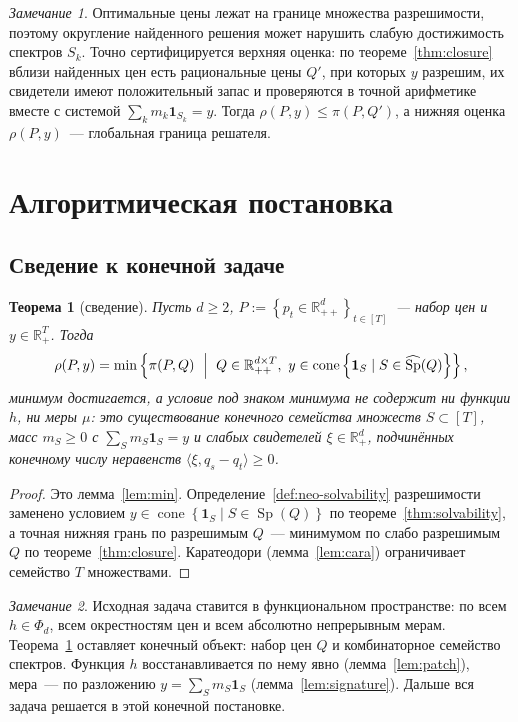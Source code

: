 \documentclass[a4paper,11pt]{article}
\theoremstyle{plain}
\newtheorem{theorem}{Теорема}[section]
\theoremstyle{definition}
\theoremstyle{remark}
\newtheorem*{remark}{Замечание}
\newcommand{\R}{\mathbb{R}}
\newcommand{\set}[1]{\left\{ #1 \right\}}
\newcommand{\ip}[2]{\langle #1, #2\rangle} %
\newcommand{\Rpp}[1][2]{\R^{#1}_{++}} %
\newcommand{\Rp}[1][2]{\R^{#1}_{+}}   %
\DeclareMathOperator{\cone}{cone}
\DeclareMathOperator{\Sp}{Sp}
\begin{document}
\begin{remark}
    Оптимальные цены лежат на границе множества разрешимости, поэтому округление найденного решения может нарушить слабую достижимость спектров $S_k$. Точно сертифицируется верхняя оценка: по теореме~\ref{thm:closure} вблизи найденных цен есть рациональные цены $Q'$, при которых $y$ разрешим, их свидетели имеют положительный запас и проверяются в точной арифметике вместе с системой $\sum_km_k\mathbf 1_{S_k}=y$. Тогда $\rho(P,y)\le\pi(P,Q')$, а нижняя оценка $\rho(P,y)$~--- глобальная граница решателя.
\end{remark}

\section{Алгоритмическая постановка}

\subsection{Сведение к конечной задаче}

\begin{theorem}[сведение]\label{thm:reduction}
    Пусть $d\ge2$, $P:=\set{p_t\in\Rpp[d]}_{t\in[T]}$~--- набор цен и $y\in\Rp[T]$. Тогда
    \[
        \rho(P,y)=\min\set{\pi(P,Q)\ \Bigm|\ Q\in\Rpp[d\times T],\ y\in\cone\set{\mathbf 1_S\mid S\in\widehat{\Sp}(Q)}},
    \]
    минимум достигается, а условие под знаком минимума не содержит ни функции $h$, ни меры $\mu$: это существование конечного семейства множеств $S\subset[T]$, масс $m_S\ge0$ с $\sum_Sm_S\mathbf 1_S=y$ и слабых свидетелей $\xi\in\Rp[d]$, подчинённых конечному числу неравенств $\ip{\xi}{q_s-q_t}\ge0$.
\end{theorem}

\begin{proof}
    Это лемма~\ref{lem:min}. Определение~\ref{def:neo-solvability} разрешимости заменено условием $y\in\cone\set{\mathbf 1_S\mid S\in\Sp(Q)}$ по теореме~\ref{thm:solvability}, а точная нижняя грань по разрешимым $Q$~--- минимумом по слабо разрешимым $Q$ по теореме~\ref{thm:closure}. Каратеодори (лемма~\ref{lem:cara}) ограничивает семейство $T$ множествами.
\end{proof}

\begin{remark}
    Исходная задача ставится в функциональном пространстве: по всем $h\in\Phi_d$, всем окрестностям цен и всем абсолютно непрерывным мерам. Теорема~\ref{thm:reduction} оставляет конечный объект: набор цен $Q$ и комбинаторное семейство спектров. Функция $h$ восстанавливается по нему явно (лемма~\ref{lem:patch}), мера~--- по разложению $y=\sum_Sm_S\mathbf 1_S$ (лемма~\ref{lem:signature}). Дальше вся задача решается в этой конечной постановке.
\end{remark}
\end{document}

